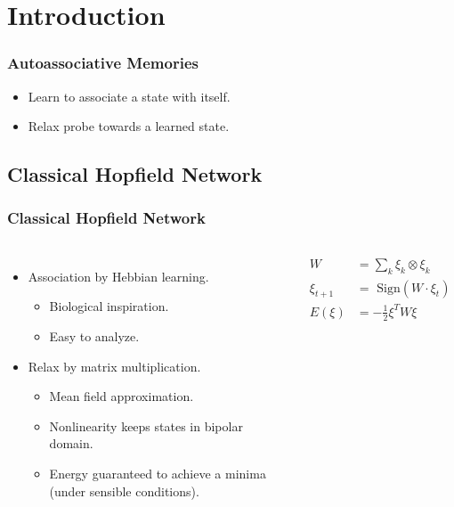 
\section{Introduction} 

\begin{frame}
	
\frametitle{Autoassociative Memories}

\begin{itemize}
    \item Learn to associate a state with itself.
    \item Relax probe towards a learned state.
\end{itemize}


\end{frame}


\subsection{Classical Hopfield Network} 

\begin{frame}
	
    \frametitle{Classical Hopfield Network}
    \begin{columns}[c]
        \begin{itemize}
            \item Association by Hebbian learning.
            \begin{itemize}
                \item Biological inspiration.
                \item Easy to analyze.
            \end{itemize}
            \item Relax by matrix multiplication.
            \begin{itemize}
                \item Mean field approximation.
                \item Nonlinearity keeps states in bipolar domain.
                \item Energy guaranteed to achieve a minima (under sensible conditions).
            \end{itemize}
        \end{itemize}

        \begin{align}
            W &= \sum_{k} \xi_k \otimes \xi_k \\
            \xi_{t+1} &= \text{ Sign}\left( W \cdot \xi_{t} \right) \\
            E \left( \xi \right) &= -\frac{1}{2} \xi^T W \xi
        \end{align}
    \end{columns}
\end{frame}

